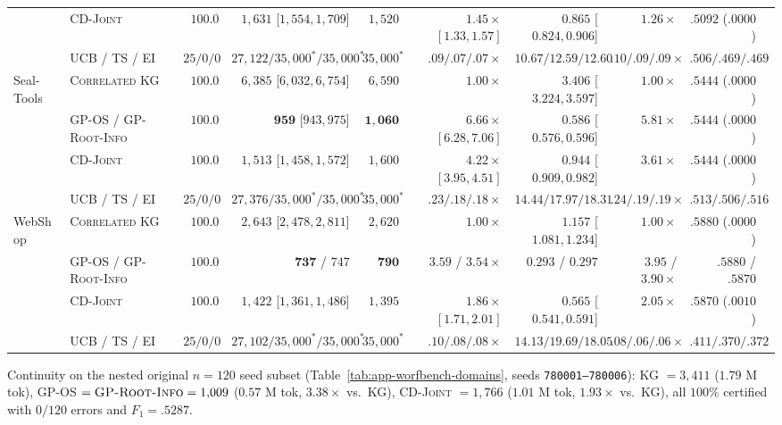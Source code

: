 \documentclass{article}
\theoremstyle{plain}
\theoremstyle{definition}
\begin{document}
\begin{table}[!htbp]
{\begin{tabular}{@{}llrrrrrrrr@{}}
 & \textsc{CD-Joint} & $100.0$ & $1{,}631$ [$1{,}554,1{,}709$] & $1{,}520$ & $1.45\times$ $[1.33,1.57]$ & $0.865$ [$0.824,0.906$] & $1.26\times$ & $.5092$ ($.0000$) \\
 & \textsc{UCB} / \textsc{TS} / \textsc{EI} & $25/0/0$ & $27{,}122 / 35{,}000^* / 35{,}000^*$ & $35{,}000^*$ & $.09/.07/.07\times$ & $10.67 / 12.59 / 12.60$ & $.10/.09/.09\times$ & $.506/.469/.469$ \\
\midrule
\multirow{4}{*}{Seal-Tools}
 & \textsc{Correlated KG} & $100.0$ & $6{,}385$ [$6{,}032,6{,}754$] & $6{,}590$ & $1.00\times$ & $3.406$ [$3.224,3.597$] & $1.00\times$ & $.5444$ ($.0000$) \\
 & \textsc{GP-OS} / \textsc{GP-Root-Info} & $100.0$ & $\mathbf{959}$ [$943,975$] & $\mathbf{1{,}060}$ & $\mathbf{6.66\times}$ $[6.28,7.06]$ & $\mathbf{0.586}$ [$0.576,0.596$] & $\mathbf{5.81\times}$ & $.5444$ ($.0000$) \\
 & \textsc{CD-Joint} & $100.0$ & $1{,}513$ [$1{,}458,1{,}572$] & $1{,}600$ & $4.22\times$ $[3.95,4.51]$ & $0.944$ [$0.909,0.982$] & $3.61\times$ & $.5444$ ($.0000$) \\
 & \textsc{UCB} / \textsc{TS} / \textsc{EI} & $25/0/0$ & $27{,}376 / 35{,}000^* / 35{,}000^*$ & $35{,}000^*$ & $.23/.18/.18\times$ & $14.44 / 17.97 / 18.31$ & $.24/.19/.19\times$ & $.513/.506/.516$ \\
\midrule
\multirow{4}{*}{WebShop}
 & \textsc{Correlated KG} & $100.0$ & $2{,}643$ [$2{,}478,2{,}811$] & $2{,}620$ & $1.00\times$ & $1.157$ [$1.081,1.234$] & $1.00\times$ & $.5880$ ($.0000$) \\
 & \textsc{GP-OS} / \textsc{GP-Root-Info} & $100.0$ & $\mathbf{737}$ / $747$ & $\mathbf{790}$ & $\mathbf{3.59}$ / $3.54\times$ & $\mathbf{0.293}$ / $0.297$ & $\mathbf{3.95}$ / $3.90\times$ & $.5880$ / $.5870$ \\
 & \textsc{CD-Joint} & $100.0$ & $1{,}422$ [$1{,}361,1{,}486$] & $1{,}395$ & $1.86\times$ $[1.71,2.01]$ & $0.565$ [$0.541,0.591$] & $2.05\times$ & $.5870$ ($.0010$) \\
 & \textsc{UCB} / \textsc{TS} / \textsc{EI} & $25/0/0$ & $27{,}102 / 35{,}000^* / 35{,}000^*$ & $35{,}000^*$ & $.10/.08/.08\times$ & $14.13 / 19.69 / 18.05$ & $.08/.06/.06\times$ & $.411/.370/.372$ \\
\bottomrule
\end{tabular}%
}
\par\vspace{2pt}\noindent
\parbox{\linewidth}{\scriptsize Continuity on the nested original $n=120$ seed subset (Table~\ref{tab:app-worfbench-domains}, seeds \texttt{780001--780006}): \textsc{KG} $=3{,}411$ ($1.79\text{ M}$ tok), \textsc{GP-OS} $=\textsc{GP-Root-Info}=1{,}009$ ($0.57\text{ M}$ tok, $3.38\times$ vs.\ KG), \textsc{CD-Joint} $=1{,}766$ ($1.01\text{ M}$ tok, $1.93\times$ vs.\ KG), all $100\%$ certified with $0/120$ errors and $F_1=.5287$.}
\end{table}
\end{document}
